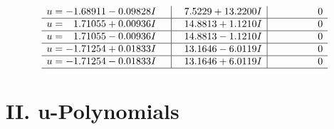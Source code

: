 \documentclass[1p]{elsarticle_modified}
\theoremstyle{definition}
\begin{document}
$$\begin{array}{c|c|c}
\begin{aligned}
u &= -1.68911 - 0.09828 I\end{aligned}
 & \phantom{-}7.5229 + 13.2200 I & \phantom{-0.000000 } 0 \\ \hline\begin{aligned}
u &= \phantom{-}1.71055 + 0.00936 I\end{aligned}
 & \phantom{-}14.8813 + 1.1210 I & \phantom{-0.000000 } 0 \\ \hline\begin{aligned}
u &= \phantom{-}1.71055 - 0.00936 I\end{aligned}
 & \phantom{-}14.8813 - 1.1210 I & \phantom{-0.000000 } 0 \\ \hline\begin{aligned}
u &= -1.71254 + 0.01833 I\end{aligned}
 & \phantom{-}13.1646 - 6.0119 I & \phantom{-0.000000 } 0 \\ \hline\begin{aligned}
u &= -1.71254 - 0.01833 I\end{aligned}
 & \phantom{-}13.1646 + 6.0119 I & \phantom{-0.000000 } 0\\
 \hline 
 \end{array}$$\newpage
\newpage\renewcommand{\arraystretch}{1}
\centering \section*{ II. u-Polynomials}
\end{document}
